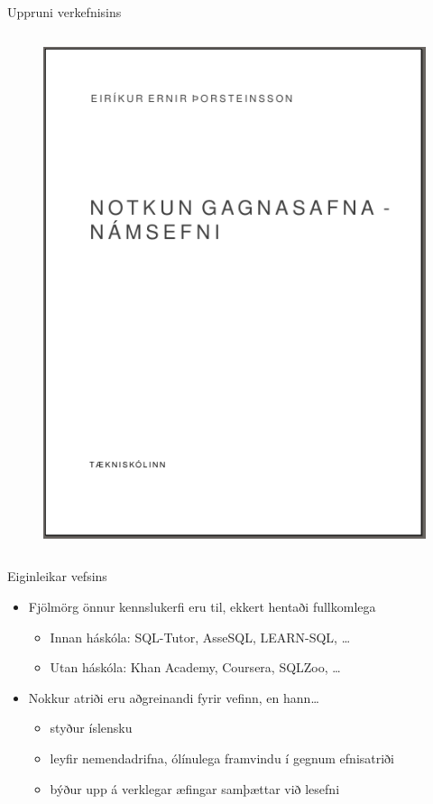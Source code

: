 \documentclass{beamer}
\begin{document}
\begin{frame}{Uppruni verkefnisins}
\begin{columns}
\begin{figure}
            \includegraphics[width=\textwidth]{notkun-gagnasafna}
        \end{figure}
    \end{columns}
\end{frame}

\begin{frame}{Eiginleikar vefsins}
    \begin{itemize}
        \item Fjölmörg önnur kennslukerfi eru til, ekkert hentaði fullkomlega
        \begin{itemize}
            \item Innan háskóla: SQL-Tutor, AsseSQL, LEARN-SQL, \ldots
            \item Utan háskóla: Khan Academy, Coursera, SQLZoo, \ldots
        \end{itemize}
        \item Nokkur atriði eru aðgreinandi fyrir vefinn, en hann\ldots
        \begin{itemize}
            \item styður íslensku
            \item leyfir nemendadrifna, ólínulega framvindu í gegnum efnisatriði
            \item býður upp á verklegar æfingar samþættar við lesefni
        \end{itemize}
    \end{itemize}
\end{frame}
\end{document}
